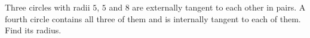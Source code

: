 Three circles with radii $5$, $5$ and $8$ are externally tangent to each other in pairs. A fourth circle contains all three of them and is internally tangent to each of them. Find its radius.
